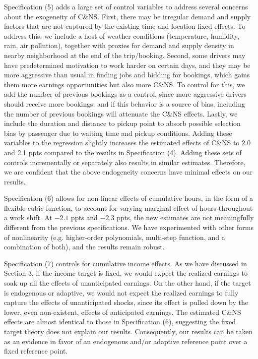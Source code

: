 \documentclass[reviewmode]{restat}
\begin{document}
Specification (5) adds a large set of control variables to address several concerns about the exogeneity 
of C\&NS. First, there may be irregular demand and supply factors that are not captured by the existing
time and location fixed effects. To address this, we include a host of weather conditions (temperature,
humidity, rain, air pollution), together with proxies for demand and supply density in nearby neighborhood 
at the end of the trip/booking. Second, some drivers may have predetermined motivation to work harder on 
certain days, and they may be more aggressive than usual in finding jobs and bidding for bookings, 
which gains them more earnings opportunities but also more  C\&NS. To control for this, we add the number
of previous bookings as a control, since more aggressive drivers should receive more bookings, 
and if this behavior is a source of bias, including the number of previous bookings will attenuate the
C\&NS effects. Lastly, we  include the duration and distance to pickup point to absorb possible selection
bias by passenger due to waiting time and pickup conditions. Adding these variables to the regression 
slightly increases the estimated effects of C\&NS to 2.0 and 2.1 ppts compared to the results in
Specification (4). Adding these sets of controls incrementally or separately also results in similar 
estimates. Therefore, we are confident that the above endogeneity concerns have minimal effects on our results.

Specification (6) allows for non-linear effects of cumulative hours, in the form of a flexible cubic function,
to account for varying marginal effect of hours throughout a work shift. At $-2.1$ ppts and $-2.3$ ppts, 
the new estimates are not meaningfully different from the previous specifications. We have experimented with 
other forms of nonlinearity (e.g. higher-order polynomials, multi-step function, and a combination of both),
and the results remain robust. 

Specification (7) controls for cumulative income effects. As we have discussed in Section 3, if the income
target is fixed, we would expect the realized earnings to soak up all the effects of unanticipated earnings.
On the other hand, if the target is endogenous or adaptive, we would not expect the realized earnings to
fully capture the effects of unanticipated shocks, since its effect is pulled down by the lower, 
even non-existent, effects of anticipated earnings. The estimated C\&NS effects are almost identical to
those in Specification (6), suggesting the fixed target theory does not explain our results. Consequently, 
our results can be taken as an evidence in favor of an endogenous and/or adaptive reference point over a 
fixed reference point. 
\end{document}
